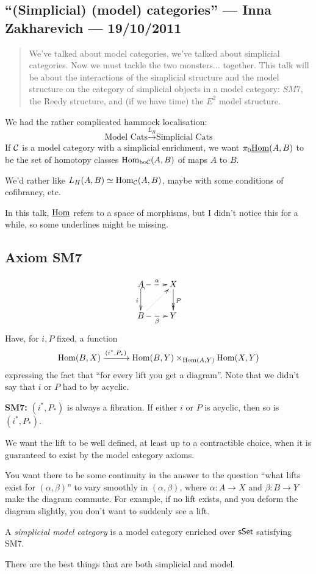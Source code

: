 \documentclass[11pt]{article}
\newcommand{\KanSemResponse}[1]
{
\thispagestyle{fancy}
\subsection*{#1}
}
\begin{document}
\begin{InnaSimplicalModelCats}
\KanSemResponse
{``(Simplicial) (model) categories'' --- Inna Zakharevich --- 19/10/2011}
\begin{abstract}
We've talked about model categories, we've talked about simplicial categories. Now we must tackle the two monsters... together. This talk will be about the interactions of the simplicial structure and the model structure on the category of simplicial objects in a model category: $SM7$, the Reedy structure, and (if we have time) the $E^2$ model structure.
\end{abstract}
We had the rather complicated hammock localisation:
\[\text{Model Cats}\overset{L_H}{\to}\text{Simplicial Cats}\]
If $\mathcal{C}$ is a model category with a simplicial enrichment, we want $\pi_0\underline{\operatorname{Hom}}(A,B)$ to be the set of homotopy classes $\operatorname{Hom}_{\textup{ho}\mathcal{C}}(A,B)$ of maps $A$ to $B$.

We'd rather like $L_H(A,B)\simeq \operatorname{Hom}_{\mathcal{C}}(A,B)$, maybe with some conditions of cofibrancy, etc.

In this talk, $\underline{\operatorname{Hom}}$ refers to a space of morphisms, but I didn't notice this for a while, so some underlines might be missing.
\subsection*{Axiom SM7}
\[\xymatrix{
A\ar@{-->}[r]^\alpha\ar@{^{(}->}[d]_i&X\ar@{->>}[d]^P\\
B\ar@{-->}[r]_\beta\ar@{..>}[ur]&Y
}\]
Have, for $i,P$ fixed, a function 
 \[\operatorname{Hom}(B,X)\xrightarrow{(i^*,P_*)}\operatorname{Hom}(B,Y)\times_{\operatorname{Hom}(A,Y)}\operatorname{Hom}(X,Y)\]
expressing the fact that ``for every lift you get a diagram''. Note that
we didn't say that $i$ or $P$ had to by acyclic.

\noindent \textbf{\Bullet SM7:} $(i^*,P_*)$ is always a fibration. If either $i$ or $P$ is acyclic, then so is $(i^*,P_*)$.
\begin{itemise}
\item We want the lift to be well defined, at least up to a contractible choice, when it is guaranteed to exist by the model category axioms.
\item You want there to be some continuity in the answer to the question ``what lifts exist for $(\alpha,\beta)$'' to vary smoothly in $(\alpha,\beta)$, where $\alpha:A\to X$ and $\beta:B\to Y$ make the diagram commute. For example, if no lift exists, and you deform the diagram slightly, you don't want to suddenly see a lift.
\end{itemise}
\begin{defn*}
A \emph{simplicial model category} is a model category enriched over $\operatorname{{\mathsf{sSet}}}$ satisfying SM7.
\end{defn*}
\noindent There are the best things that are both simplicial and model.

\end{InnaSimplicalModelCats}
\end{document}
